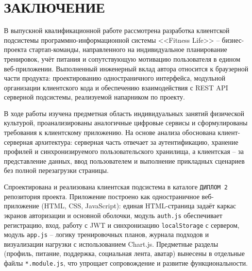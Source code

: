 \section*{ЗАКЛЮЧЕНИЕ}

В выпускной квалификационной работе рассмотрена разработка клиентской подсистемы программно-информационной системы <<Fitness Life>> -- бизнес-проекта стартап-команды, направленного на индивидуальное планирование тренировок, учёт питания и сопутствующую мотивацию пользователя в едином веб-приложении. Выполненный инженерный вклад автора относится к браузерной части продукта: проектированию одностраничного интерфейса, модульной организации клиентского кода и обеспечению взаимодействия с REST API серверной подсистемы, реализуемой напарником по проекту.

В ходе работы изучена предметная область индивидуальных занятий физической культурой, проанализированы аналогичные цифровые сервисы и сформулированы требования к клиентскому приложению. На основе анализа обоснована клиент-серверная архитектура: серверная часть отвечает за аутентификацию, хранение профилей и синхронизируемого пользовательского хранилища, а клиентская -- за представление данных, ввод пользователем и выполнение прикладных сценариев без полной перезагрузки страницы.

Спроектирована и реализована клиентская подсистема в каталоге \texttt{ДИПЛОМ 2} репозитория проекта. Приложение построено как одностраничное веб-приложение (HTML, CSS, JavaScript): единая HTML-страница задаёт каркас экранов авторизации и основной оболочки, модуль \texttt{auth.js} обеспечивает регистрацию, вход, работу с JWT и синхронизацию \texttt{localStorage} с сервером, модуль \texttt{app.js} -- логику тренировочных планов, журнала подходов и визуализации нагрузки с использованием Chart.js. Предметные разделы (профиль, питание, поддержка, социальная лента, аватар) вынесены в отдельные файлы \texttt{*.module.js}, что упрощает сопровождение и развитие функциональности.

